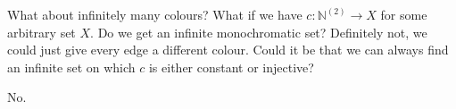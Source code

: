 \documentclass{article}
\begin{document}
What about infinitely many colours? What if we have $c: \mathbb{N}^{(2)} \to X$ for some arbitrary set $X$.
Do we get an infinite monochromatic set? Definitely not, we could just give every edge a different colour.
Could it be that we can always find an infinite set on which $c$ is either constant or injective?

\begin{center}
\end{center}
No.
\printindex
\end{document}
